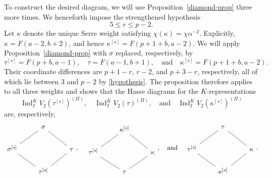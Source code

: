 \documentclass[a4paper,10pt,twoside]{amsart}
\DeclareMathOperator{\Ind}{Ind}
\theoremstyle{definition}
\numberwithin{equation}{section}
\begin{document}
To construct the desired diagram, we will use
Proposition~\ref{diamond-prop} three more times.
We henceforth impose the strengthened hypothesis
\begin{equation}\label{hypothesis}
5\leq r\leq p-2.
\end{equation}
Let \(\kappa\) denote the unique Serre weight satisfying
\(\chi(\kappa)=\chi\alpha^{-2}\). Explicitly,
\(\kappa=F(a-2,b+2)\), and hence
\(\kappa^{[s]}=F(p+1+b,a-2)\). We will apply Proposition~\ref{diamond-prop} with
\(\sigma\) replaced, respectively, by
\[
\tau^{[s]}=F(p+b,a-1),\quad
\tau=F(a-1,b+1),\quad \text{and} \quad
\kappa^{[s]}=F(p+1+b,a-2).
\]
Their coordinate differences are \(p+1-r\), \(r-2\),
and \(p+3-r\), respectively, all of which lie between
\(3\) and \(p-2\) by \eqref{hypothesis}. The proposition therefore applies to all three weights
and shows that the Hasse diagrams for the
\(K\)-representations
\[
\Ind_I^K V_2(\tau^{[s]})^{(\Pi)},\quad
\Ind_I^K V_2(\tau)^{(\Pi)},\quad \text{and}\quad
\Ind_I^K V_2(\kappa^{[s]})^{(\Pi)}
\]
are, respectively,
\[
\begin{tikzcd}
   & \sigma & \\
    {\sigma^{[s]}} & {} & \tau \\
    & {\tau^{[s]}}
    \arrow[no head, from=1-2, to=2-1]
    \arrow[no head, from=1-2, to=2-3]
    \arrow[no head, from=2-1, to=3-2]
    \arrow[no head, from=2-3, to=3-2]
\end{tikzcd},
\quad
\begin{tikzcd}
    & {\kappa^{[s]}} & \\
    {\tau^{[s]}} & {} & \kappa \\
    & \tau
    \arrow[no head, from=1-2, to=2-1]
    \arrow[no head, from=1-2, to=2-3]
    \arrow[no head, from=2-1, to=3-2]
    \arrow[no head, from=2-3, to=3-2]
\end{tikzcd},
\quad \text{and}\quad
\begin{tikzcd}
    & \tau & \\
    {\tau^{[s]}} & {} & \kappa \\
    & {\kappa^{[s]}}
    \arrow[no head, from=1-2, to=2-1]
    \arrow[no head, from=1-2, to=2-3]
    \arrow[no head, from=2-1, to=3-2]
    \arrow[no head, from=2-3, to=3-2]
\end{tikzcd}.
\]
\end{document}

